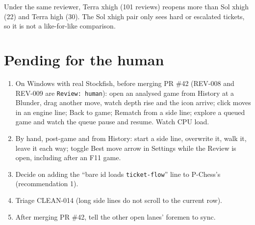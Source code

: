 \documentclass[11pt,a4paper]{article}
\begin{document}
Under the same reviewer, Terra xhigh (101 reviews) reopens more than Sol xhigh (22) and Terra
high (30). The Sol xhigh pair only sees hard or escalated tickets, so it is not a like-for-like
comparison.

\section*{Pending for the human}

\begin{enumerate}
  \item On Windows with real Stockfish, before merging PR \#42 (REV-008 and REV-009 are
        \texttt{Review: human}): open an analysed game from History at a Blunder, drag another
        move, watch depth rise and the icon arrive; click moves in an engine line; Back to game;
        Rematch from a side line; explore a queued game and watch the queue pause and resume. Watch
        CPU load.
  \item By hand, post-game and from History: start a side line, overwrite it, walk it, leave it
        each way; toggle Best move arrow in Settings while the Review is open, including after an
        F11 game.
  \item Decide on adding the ``bare id loads \texttt{ticket-flow}'' line to P-Chess's
         (recommendation 1).
  \item Triage CLEAN-014 (long side lines do not scroll to the current row).
  \item After merging PR \#42, tell the other open lanes' foremen to sync.
\end{enumerate}
\end{document}
